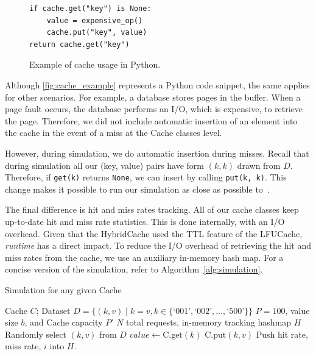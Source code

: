 \documentclass[11pt, journal]{IEEEtran}
\begin{document}
\begin{figure}[ht]
    \centering
    \begin{tcolorbox}[colback=gray!5!white, colframe=gray!75!black, title=General Cache Example]
    \begin{verbatim}
if cache.get("key") is None:
    value = expensive_op()
    cache.put("key", value)
return cache.get("key")
    \end{verbatim}
    \end{tcolorbox}
    \caption{Example of cache usage in Python.}
    \label{fig:cache_example}
\end{figure}

Although \autoref{fig:cache_example}
represents a Python code snippet, the same
applies for other scenarios. For example,
a database stores pages in the buffer. When a
page fault
occurs, the database performs an I/O, which
is expensive, to retrieve the page.
Therefore, we did not include automatic
insertion of an element into the cache in
the event of a miss at the Cache classes level.

However, during simulation, we do automatic insertion
during misses. Recall that during simulation
all our (key, value) pairs have form $(k, k)$
drawn from $D$.
Therefore, if \texttt{get(k)} returns \texttt{None},
we can insert by calling \texttt{put(k, k)}.
This change makes it possible to run our simulation
as close as possible to~\cite{shah2023ImprovedCacheEviction}.

The final difference is hit and miss rates tracking.
All of our cache classes keep up-to-date hit and miss
rate statistics. This is done internally, with an I/O overhead.
Given that the HybridCache used the TTL feature
of the LFUCache, \textit{runtime} has a direct
impact. To reduce the I/O overhead
of retrieving the hit and miss rates from
the cache, we use an auxiliary in-memory hash map.
For a concise version of the simulation,
refer to Algorithm~\ref{alg:simulation}.

\begin{algorithm}
    \caption{Simulation for any given Cache}
    \label{alg:simulation}
    \begin{algorithmic}[1]
    \Require Cache $C$; Dataset $D = \{(k, v) \mid k = v, k \in \{\text{`001'}, \text{`002'}, \ldots, \text{`500'}\}\}$
    \Require $P=100$, value size $b$, and Cache capacity $P'$
    \Require $N$ total requests,
        in-memory tracking hashmap $H$
        \State Randomly select $(k, v)$ from $D$
        \State $value \gets \text{C.get}(k)$
            \State $\text{C.put}(k, v)$
        \EndIf
        \State Push hit rate, miss rate, $i$ into $H$.
    \EndFor
    \end{algorithmic}
\end{algorithm}
\end{document}
